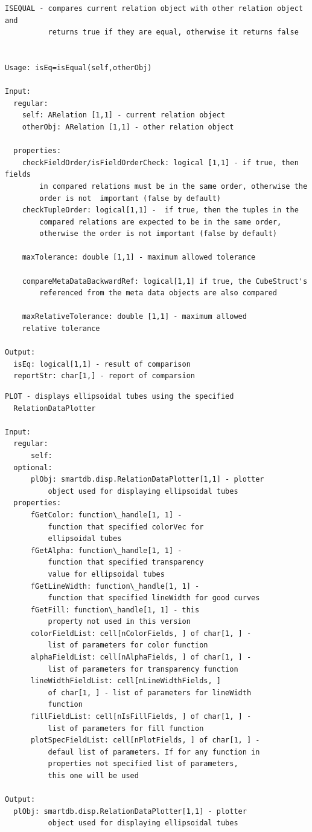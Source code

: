 \documentclass[letterpaper,10pt,english]{sphinxmanual}
\begin{document}
\begin{Verbatim}[commandchars=\\\{\}]
ISEQUAL - compares current relation object with other relation object and
          returns true if they are equal, otherwise it returns false


Usage: isEq=isEqual(self,otherObj)

Input:
  regular:
    self: ARelation [1,1] - current relation object
    otherObj: ARelation [1,1] - other relation object

  properties:
    checkFieldOrder/isFieldOrderCheck: logical [1,1] - if true, then fields
        in compared relations must be in the same order, otherwise the
        order is not  important (false by default)
    checkTupleOrder: logical[1,1] -  if true, then the tuples in the
        compared relations are expected to be in the same order,
        otherwise the order is not important (false by default)

    maxTolerance: double [1,1] - maximum allowed tolerance

    compareMetaDataBackwardRef: logical[1,1] if true, the CubeStruct's
        referenced from the meta data objects are also compared

    maxRelativeTolerance: double [1,1] - maximum allowed
    relative tolerance

Output:
  isEq: logical[1,1] - result of comparison
  reportStr: char[1,] - report of comparsion
\end{Verbatim}

\begin{Verbatim}[commandchars=\\\{\}]
PLOT - displays ellipsoidal tubes using the specified
  RelationDataPlotter

Input:
  regular:
      self:
  optional:
      plObj: smartdb.disp.RelationDataPlotter[1,1] - plotter
          object used for displaying ellipsoidal tubes
  properties:
      fGetColor: function\_handle[1, 1] -
          function that specified colorVec for
          ellipsoidal tubes
      fGetAlpha: function\_handle[1, 1] -
          function that specified transparency
          value for ellipsoidal tubes
      fGetLineWidth: function\_handle[1, 1] -
          function that specified lineWidth for good curves
      fGetFill: function\_handle[1, 1] - this
          property not used in this version
      colorFieldList: cell[nColorFields, ] of char[1, ] -
          list of parameters for color function
      alphaFieldList: cell[nAlphaFields, ] of char[1, ] -
          list of parameters for transparency function
      lineWidthFieldList: cell[nLineWidthFields, ]
          of char[1, ] - list of parameters for lineWidth
          function
      fillFieldList: cell[nIsFillFields, ] of char[1, ] -
          list of parameters for fill function
      plotSpecFieldList: cell[nPlotFields, ] of char[1, ] -
          defaul list of parameters. If for any function in
          properties not specified list of parameters,
          this one will be used

Output:
  plObj: smartdb.disp.RelationDataPlotter[1,1] - plotter
          object used for displaying ellipsoidal tubes
\end{Verbatim}
\end{document}
